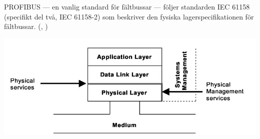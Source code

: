 \documentclass[a4paper,12pt]{article}
\newenvironment{Figure}
  {\par\medskip\noindent\minipage{\linewidth}}
  {\endminipage\par\medskip}
\begin{document}
\begin{multicols}{2}
PROFIBUS --- en vanlig standard för fältbussar --- följer standarden IEC 61158 (specifikt del två, IEC 61158-2) som beskriver den fysiska lagerspecifikationen för fältbussar. (\cite{profibuspowerplants}, \cite[s. 1083, \textit{IEC 61 158 Standard}]{fieldbustechindustrialautomation})

\begin{Figure}
	\centering
	\includegraphics[width=\linewidth]{faltbusfysisktlager}
\end{Figure}

\end{multicols}

\clearpage\printbibliography
\end{document}
